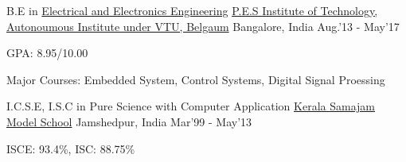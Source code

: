 \begin{cventries}
	\cventry
	{B.E in \href{https://eee.pes.edu/}{Electrical and Electronics Engineering}}
	{\href{https://pesit.pes.edu/}{P.E.S Institute of Technology, Autonoumous Institute under VTU, Belgaum}}
	{Bangalore, India}
	{Aug.'13 - May'17}
	{
		\begin{cvitems}
		\item{GPA: 8.95/10.00}
		\item{Major Courses: Embedded System, Control Systems, Digital Signal Proessing}
		\end{cvitems}
	}
\end{cventries}
\begin{cventries}
	\cventry
	{I.C.S.E, I.S.C in {Pure Science with Computer Application}}
	{\href{https://ksms.ac.in/}{Kerala Samajam Model School}}
	{Jamshedpur, India}
	{Mar'99 - May'13}
	{
		\begin{cvitems}
		\item{ISCE: 93.4\%, ISC: 88.75\%}
		\end{cvitems}
	}
\end{cventries}
